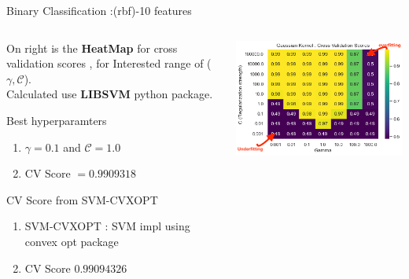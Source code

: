 \documentclass[12pt,t]{beamer}
\begin{document}
\begin{frame}[t]{Binary Classification :(rbf)-10 features}
    \scriptsize

    \begin{columns}
        \begin{column}[T]{0.35\linewidth}
            On right is the \textbf{HeatMap} for cross validation scores , for Interested range
            of ($\gamma ,\mathcal{C}$). \\ 

            Calculated use \textbf{LIBSVM} python package.


            \begin{block}{Best hyperparamters}
                \begin{enumerate}
                    \item $\gamma = 0.1$ and  $\mathcal{C} = 1.0$ 
                    \item CV Score  $ = 0.9909318$
                \end{enumerate}
                    
            \end{block}

            \begin{block}{CV Score from SVM-CVXOPT}
                \begin{enumerate}
                    \item SVM-CVXOPT : SVM impl using convex opt package
                    \item CV Score $0.99094326$
                \end{enumerate}
            \end{block}
  
        \end{column}
        \begin{column}[T]{0.7\linewidth}
            \includegraphics[width=\linewidth]{images/p1a/2(binary clf)/classes1and4_libsvm_rbf.png}
        \end{column}
    \end{columns}

\end{frame}
\end{document}
